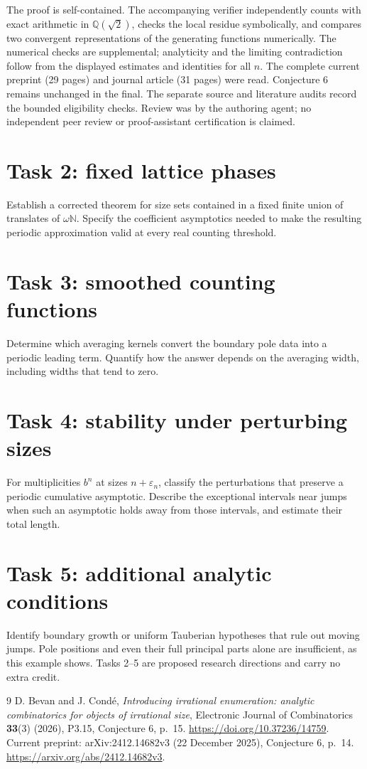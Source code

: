 \documentclass[10pt]{article}
\begin{document}
The proof is self-contained. The accompanying verifier independently
counts with exact arithmetic in \(\mathbb Q(\sqrt2)\), checks the
local residue symbolically, and compares two convergent representations
of the generating functions numerically. The numerical checks are
supplemental; analyticity and the limiting contradiction follow from
the displayed estimates and identities for all \(n\).
The complete current preprint (29 pages) and journal article
(31 pages) were read. Conjecture 6 remains unchanged in the final.
The separate source and literature audits record the bounded
eligibility checks. Review was by the authoring agent; no independent
peer review or proof-assistant certification is claimed.

\section*{Task 2: fixed lattice phases}
Establish a corrected theorem for size sets contained in a fixed
finite union of translates of \(\omega\mathbb N\). Specify the
coefficient asymptotics needed to make the resulting periodic
approximation valid at every real counting threshold.

\section*{Task 3: smoothed counting functions}
Determine which averaging kernels convert the boundary pole data into
a periodic leading term. Quantify how the answer depends on the
averaging width, including widths that tend to zero.

\section*{Task 4: stability under perturbing sizes}
For multiplicities \(b^n\) at sizes \(n+\varepsilon_n\), classify
the perturbations that preserve a periodic cumulative asymptotic.
Describe the exceptional intervals near jumps when such an asymptotic
holds away from those intervals, and estimate their total length.

\section*{Task 5: additional analytic conditions}
Identify boundary growth or uniform Tauberian hypotheses that rule
out moving jumps. Pole positions and even their full principal parts
alone are insufficient, as this example shows.
Tasks 2--5 are proposed research directions and carry no extra credit.

\begin{thebibliography}{9}
D. Bevan and J. Cond\'e,
\emph{Introducing irrational enumeration: analytic combinatorics for
objects of irrational size},
Electronic Journal of Combinatorics \textbf{33}(3) (2026), P3.15,
Conjecture 6, p.~15.
\url{https://doi.org/10.37236/14759}.
Current preprint: arXiv:2412.14682v3 (22 December 2025),
Conjecture 6, p.~14.
\url{https://arxiv.org/abs/2412.14682v3}.
\end{thebibliography}
\end{document}

